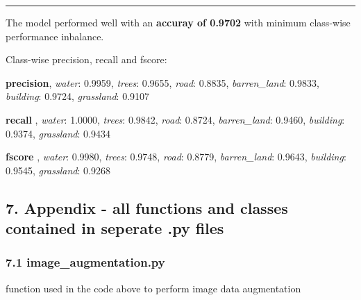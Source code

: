 \documentclass[11pt]{article}
\begin{document}
\begin{center}\rule{0.5\linewidth}{\linethickness}\end{center}

The model performed well with an \textbf{accuray of 0.9702} with minimum
class-wise performance inbalance.

Class-wise precision, recall and fscore:

\textbf{precision}, \emph{water}: 0.9959, \emph{trees}: 0.9655,
\emph{road}: 0.8835, \emph{barren\_land}: 0.9833, \emph{building}:
0.9724, \emph{grassland}: 0.9107

\textbf{recall} , \emph{water}: 1.0000, \emph{trees}: 0.9842,
\emph{road}: 0.8724, \emph{barren\_land}: 0.9460, \emph{building}:
0.9374, \emph{grassland}: 0.9434

\textbf{fscore} , \emph{water}: 0.9980, \emph{trees}: 0.9748,
\emph{road}: 0.8779, \emph{barren\_land}: 0.9643, \emph{building}:
0.9545, \emph{grassland}: 0.9268

    \subsection{7. Appendix - all functions and classes contained in
seperate .py
files}\label{appendix---all-functions-and-classes-contained-in-seperate-.py-files}

    \subsubsection{7.1 image\_augmentation.py}\label{image_augmentation.py}

function used in the code above to perform image data augmentation
\end{document}
